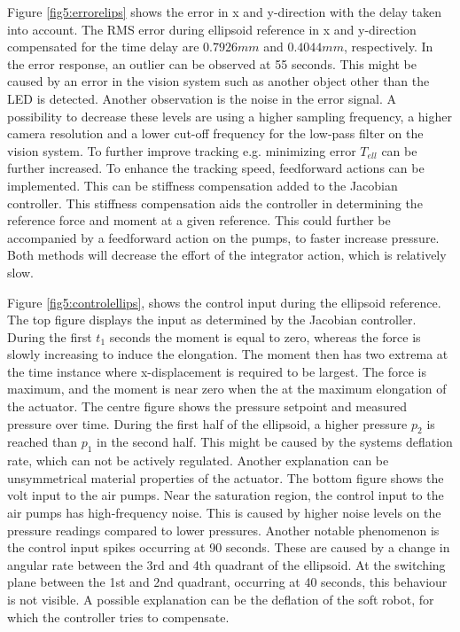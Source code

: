Figure \ref{fig5:errorelips} shows the error in x and y-direction with the delay taken into account. The RMS error during ellipsoid reference in x and y-direction compensated for the time delay are $0.7926 mm$ and $0.4044 mm$, respectively. In the error response, an outlier can be observed at 55 seconds. This might be caused by an error in the vision system such as another object other than the LED is detected. Another observation is the noise in the error signal. A possibility to decrease these levels are using a higher sampling frequency, a higher camera resolution and a lower cut-off frequency for the low-pass filter on the vision system. To further improve tracking e.g. minimizing error $T_{ell}$ can be further increased. To enhance the tracking speed, feedforward actions can be implemented. This can be stiffness compensation added to the Jacobian controller. This stiffness compensation aids the controller in determining the reference force and moment at a given reference. This could further be accompanied by a feedforward action on the pumps, to faster increase pressure. Both methods will decrease the effort of the integrator action, which is relatively slow. 

Figure \ref{fig5:controlellips}, shows the control input during the ellipsoid reference. The top figure displays the input as determined by the Jacobian controller. During the first $t_1$ seconds the moment is equal to zero, whereas the force is slowly increasing to induce the elongation. The moment then has two extrema at the time instance where x-displacement is required to be largest. The force is maximum, and the moment is near zero when the at the maximum elongation of the actuator. The centre figure shows the pressure setpoint and measured pressure over time. During the first half of the ellipsoid, a higher pressure $p_2$ is reached than $p_1$ in the second half. This might be caused by the systems deflation rate, which can not be actively regulated. Another explanation can be unsymmetrical material properties of the actuator. The bottom figure shows the volt input to the air pumps. Near the saturation region, the control input to the air pumps has high-frequency noise. This is caused by higher noise levels on the pressure readings compared to lower pressures. Another notable phenomenon is the control input spikes occurring at 90 seconds. These are caused by a change in angular rate between the 3rd and 4th quadrant of the ellipsoid. At the switching plane between the 1st and 2nd quadrant, occurring at 40 seconds, this behaviour is not visible. A possible explanation can be the deflation of the soft robot, for which the controller tries to compensate. 

